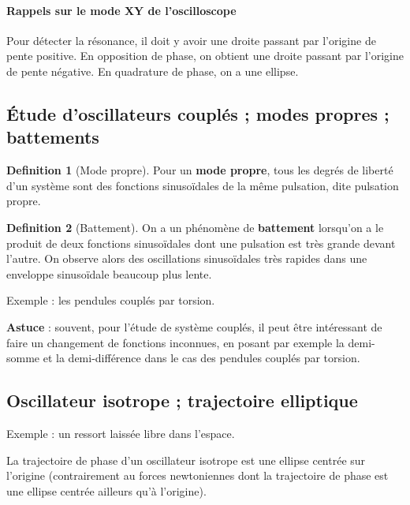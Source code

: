 \documentclass[french]{book}
\theoremstyle{plain}
\theoremstyle{definition}
\newtheorem{dfn}{Definition}
\theoremstyle{remark}
\begin{document}
\paragraph{Rappels sur le mode XY de l'oscilloscope} Pour détecter la résonance, il doit y avoir une droite passant par l'origine de pente positive. En opposition de phase, on obtient une droite passant par l'origine de pente négative. En quadrature de phase, on a une ellipse.
\subsection{Étude d'oscillateurs couplés ; modes propres ; battements}
\begin{dfn}[Mode propre]
	Pour un \textbf{mode propre}, tous les degrés de liberté d'un système sont des fonctions sinusoïdales de la même pulsation, dite pulsation propre.
\end{dfn}
\begin{dfn}[Battement]
	On a un phénomène de \textbf{battement} lorsqu'on a le produit de deux fonctions sinusoïdales dont une pulsation est très grande devant l'autre. On observe alors des oscillations sinusoïdales très rapides dans une enveloppe sinusoïdale beaucoup plus lente.
\end{dfn}
Exemple : les pendules couplés par torsion. \\ \par \textbf{Astuce} : souvent, pour l'étude de système couplés, il peut être intéressant de faire un changement de fonctions inconnues, en posant par exemple la demi-somme et la demi-différence dans le cas des pendules couplés par torsion.
\subsection{Oscillateur isotrope ; trajectoire elliptique}
Exemple : un ressort laissée libre dans l'espace. \\ \par La trajectoire de phase d'un oscillateur isotrope est une ellipse centrée sur l'origine (contrairement au forces newtoniennes dont la trajectoire de phase est une ellipse centrée ailleurs qu'à l'origine).
\end{document}
